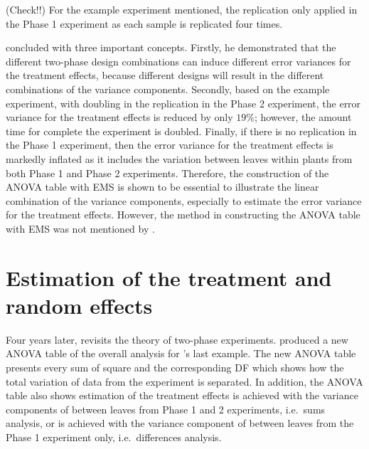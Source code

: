\documentclass[11pt,a4paper]{article}
\begin{document}
(Check!!) For the example experiment mentioned, the replication only applied in the Phase 1 experiment as each sample is replicated four times. 

\citeauthor{McIntyre1955} concluded with three important concepts. Firstly, he demonstrated that the different two-phase design combinations can induce different error variances for the treatment effects, because different designs will result in the different combinations of the variance components. Secondly, based on the example experiment, with doubling in the replication in the Phase 2 experiment, the error variance for the treatment effects is reduced by only $19\%$; however, the amount time for complete the experiment is doubled. Finally, if there is no replication in the Phase 1 experiment, then the error variance for the treatment effects is markedly inflated as it includes the variation between leaves within plants from both Phase 1 and Phase 2 experiments. Therefore, the construction of the ANOVA table with EMS is shown to be essential to illustrate the linear combination of the variance components, especially to estimate the error variance for the treatment effects. However, the method in constructing the ANOVA table with EMS was not mentioned by \citeauthor{McIntyre1955}.
 
\section{Estimation of the treatment and random effects}
Four years later, \cite{Curnow1959} revisits the theory of two-phase experiments. \cite{Curnow1959} produced a new ANOVA table of the overall analysis for \citeauthor{McIntyre1955}’s last example. The new ANOVA table presents every sum of square and the corresponding DF
which shows how the total variation of data from the experiment is separated. In addition, the ANOVA table also shows estimation of the treatment effects is achieved with the variance components of between leaves from Phase 1 and 2 experiments, i.e.\ sums analysis, or is achieved with the variance component of between leaves from the Phase 1 experiment only, i.e.\ differences analysis. 
\end{document}

